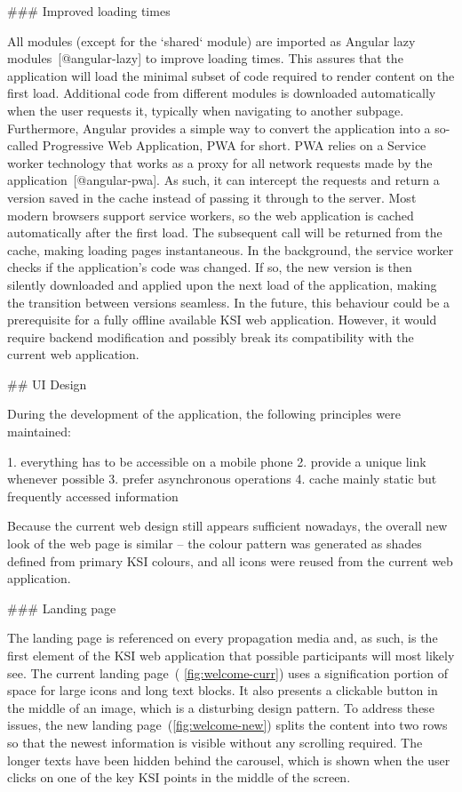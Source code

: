 \documentclass[
  digital, %
  oneside, %
  lof,     %
  nolot,     %
]{fithesis4}
\begin{document}
{### Improved loading times
\label{chap:faster}

All modules (except for the `shared` module) are imported as Angular lazy modules~[@angular-lazy] to improve loading times. This assures that the application will load the minimal subset of code required to render content on the first load. Additional code from different modules is downloaded automatically when the user requests it, typically when navigating to another subpage. Furthermore, Angular provides a simple way to convert the application into a so-called Progressive Web Application, \acrshort{PWA} for short. \acrshort{PWA} relies on a Service worker technology that works as a proxy for all network requests made by the application~[@angular-pwa]. As such, it can intercept the requests and return a version saved in the cache instead of passing it through to the server. Most modern browsers support service workers, so the web application is cached automatically after the first load. The subsequent call will be returned from the cache, making loading pages instantaneous. In the background, the service worker checks if the application's code was changed. If so, the new version is then silently downloaded and applied upon the next load of the application, making the transition between versions seamless. In the future, this behaviour could be a prerequisite for a fully offline available \acrshort{KSI} web application. However, it would require backend modification and possibly break its compatibility with the current web application.

## UI Design

During the development of the application, the following principles were maintained:

1. everything has to be accessible on a mobile phone
2. provide a unique link whenever possible
3. prefer asynchronous operations
4. cache mainly static but frequently accessed information

Because the current web design still appears sufficient nowadays, the overall new look of the web page is similar -- the colour pattern was generated as shades defined from primary \acrshort{KSI} colours, and all icons were reused from the current web application.

### Landing page

The landing page is referenced on every propagation media and, as such, is the first element of the \acrshort{KSI} web application that possible participants will most likely see. The current landing page~( \autoref{fig:welcome-curr}) uses a signification portion of space for large icons and long text blocks. It also presents a clickable button in the middle of an image, which is a disturbing design pattern. To address these issues, the new landing page~(\autoref{fig:welcome-new}) splits the content into two rows so that the newest information is visible without any scrolling required. The longer texts have been hidden behind the carousel, which is shown when the user clicks on one of the key \acrshort{KSI} points in the middle of the screen.

}
\end{document}
